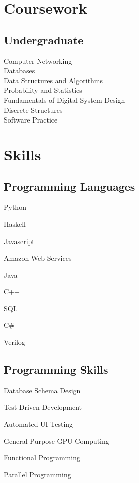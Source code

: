 \documentclass[letterpaper]{deedy-resume} %
\begin{document}
\begin{minipage}[t]{0.35\textwidth}
\section{Coursework}


\subsection{Undergraduate}

Computer Networking \\
Databases \\
Data Structures and Algorithms \\
Probability and Statistics \\
Fundamentals of Digital System Design \\
Discrete Structures \\
Software Practice \\


\sectionspace %


\section{Skills}

\subsection{Programming Languages}
\begin{tightitemize}
\vspace{\topsep} %
\item Python
\item Haskell
\item Javascript
\item Amazon Web Services
\item Java
\item C++
\item SQL
\item C\#
\item Verilog
\end{tightitemize}

\subsection{Programming Skills}
\begin{tightitemize}
\vspace{\topsep} %
\item Database Schema Design
\item Test Driven Development
\item Automated UI Testing
\item General-Purpose GPU Computing
\item Functional Programming
\item Parallel Programming
\end{tightitemize}


\end{minipage}
\end{document}
